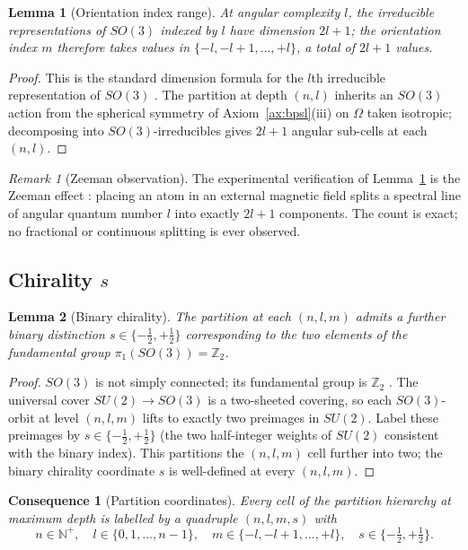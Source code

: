 \documentclass[11pt,twocolumn,a4paper]{article}
\theoremstyle{axiomstyle}
\theoremstyle{conseqstyle}
\newtheorem{consequence}{Consequence}
\newtheorem{lemma}{Lemma}
\theoremstyle{definition}
\theoremstyle{remark}
\newtheorem*{remark}{Remark}
\newcommand{\Natural}{\mathbb{N}}
\newcommand{\Integer}{\mathbb{Z}}
\begin{document}
\begin{lemma}[Orientation index range]
\label{lem:mrange}
At angular complexity $l$, the irreducible representations of $SO(3)$ indexed by $l$ have dimension $2l+1$; the orientation index $m$ therefore takes values in $\{-l,-l+1,\ldots,+l\}$, a total of $2l+1$ values.
\end{lemma}
\begin{proof}
This is the standard dimension formula for the $l$th irreducible representation of $SO(3)$ \citep{wigner1959,sakurai2017}. The partition at depth $(n,l)$ inherits an $SO(3)$ action from the spherical symmetry of Axiom~\ref{ax:bpsl}(iii) on $\Omega$ taken isotropic; decomposing into $SO(3)$-irreducibles gives $2l+1$ angular sub-cells at each $(n,l)$.
\end{proof}

\begin{remark}[Zeeman observation]
The experimental verification of Lemma~\ref{lem:mrange} is the Zeeman effect \citep{zeeman1897}: placing an atom in an external magnetic field splits a spectral line of angular quantum number $l$ into exactly $2l+1$ components. The count is exact; no fractional or continuous splitting is ever observed.
\end{remark}

\subsection{Chirality $s$}

\begin{lemma}[Binary chirality]
\label{lem:chirality}
The partition at each $(n,l,m)$ admits a further binary distinction $s\in\{-\tfrac12,+\tfrac12\}$ corresponding to the two elements of the fundamental group $\pi_{1}(SO(3))=\Integer_{2}$.
\end{lemma}
\begin{proof}
$SO(3)$ is not simply connected; its fundamental group is $\Integer_{2}$ \citep{nakahara2003}. The universal cover $SU(2)\to SO(3)$ is a two-sheeted covering, so each $SO(3)$-orbit at level $(n,l,m)$ lifts to exactly two preimages in $SU(2)$. Label these preimages by $s\in\{-\tfrac12,+\tfrac12\}$ (the two half-integer weights of $SU(2)$ consistent with the binary index). This partitions the $(n,l,m)$ cell further into two; the binary chirality coordinate $s$ is well-defined at every $(n,l,m)$.
\end{proof}

\begin{consequence}[Partition coordinates]
\label{cons:quantumnumbers}
Every cell of the partition hierarchy at maximum depth is labelled by a quadruple $(n,l,m,s)$ with
\begin{equation}
n\in\Natural^{+},\quad l\in\{0,1,\ldots,n-1\},\quad m\in\{-l,-l+1,\ldots,+l\},\quad s\in\{-\tfrac12,+\tfrac12\}.
\label{eq:nlms}
\end{equation}
\end{consequence}
\end{document}
